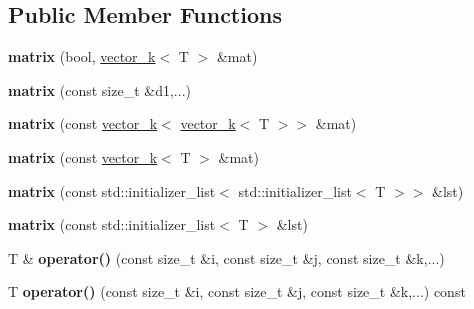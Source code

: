 \subsection*{Public Member Functions}
\begin{DoxyCompactItemize}
\item 
\hypertarget{classkeycpp_1_1matrix_a08e0f5af92405fae766008d86bd4d9f6}{{\bfseries matrix} (bool, \hyperlink{classkeycpp_1_1vector__k}{vector\-\_\-k}$<$ T $>$ \&mat)}\label{classkeycpp_1_1matrix_a08e0f5af92405fae766008d86bd4d9f6}

\item 
\hypertarget{classkeycpp_1_1matrix_a0f64310d4a9f4af4a0e8bce2d4f826ae}{{\bfseries matrix} (const size\-\_\-t \&d1,...)}\label{classkeycpp_1_1matrix_a0f64310d4a9f4af4a0e8bce2d4f826ae}

\item 
\hypertarget{classkeycpp_1_1matrix_aec6b86d059d88ae9c02dcc8309c09d97}{{\bfseries matrix} (const \hyperlink{classkeycpp_1_1vector__k}{vector\-\_\-k}$<$ \hyperlink{classkeycpp_1_1vector__k}{vector\-\_\-k}$<$ T $>$$>$ \&mat)}\label{classkeycpp_1_1matrix_aec6b86d059d88ae9c02dcc8309c09d97}

\item 
\hypertarget{classkeycpp_1_1matrix_a3b8bc665d15dd7e20fc6a72c8c995232}{{\bfseries matrix} (const \hyperlink{classkeycpp_1_1vector__k}{vector\-\_\-k}$<$ T $>$ \&mat)}\label{classkeycpp_1_1matrix_a3b8bc665d15dd7e20fc6a72c8c995232}

\item 
\hypertarget{classkeycpp_1_1matrix_acf5cdf8a8d5396420b87a188483a6cb3}{{\bfseries matrix} (const std\-::initializer\-\_\-list$<$ std\-::initializer\-\_\-list$<$ T $>$$>$ \&lst)}\label{classkeycpp_1_1matrix_acf5cdf8a8d5396420b87a188483a6cb3}

\item 
\hypertarget{classkeycpp_1_1matrix_a23a9ee6ced1a3797a8fd974a7d3b0803}{{\bfseries matrix} (const std\-::initializer\-\_\-list$<$ T $>$ \&lst)}\label{classkeycpp_1_1matrix_a23a9ee6ced1a3797a8fd974a7d3b0803}

\item 
\hypertarget{classkeycpp_1_1matrix_ab7d6c3bda37ffcfb007105fb150dedd1}{T \& {\bfseries operator()} (const size\-\_\-t \&i, const size\-\_\-t \&j, const size\-\_\-t \&k,...)}\label{classkeycpp_1_1matrix_ab7d6c3bda37ffcfb007105fb150dedd1}

\item 
\hypertarget{classkeycpp_1_1matrix_a64eab0f7e909d7858679338a52530ba9}{T {\bfseries operator()} (const size\-\_\-t \&i, const size\-\_\-t \&j, const size\-\_\-t \&k,...) const }\label{classkeycpp_1_1matrix_a64eab0f7e909d7858679338a52530ba9}


\end{DoxyCompactItemize}

